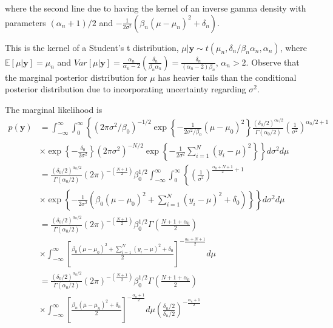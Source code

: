 \begin{enumerate}
where the second line due to having the kernel of an inverse gamma density with parameters $(\alpha_n+1)/2$ and $-\frac{1}{2\sigma^2}(\beta_n(\mu-\mu_n)^2+\delta_n)$.

This is the kernel of a Student's t distribution, $\mu|\mathbf{y}\sim t(\mu_n,\delta_n/\beta_n\alpha_n,\alpha_n)$, where $\mathbb{E}[\mu|\mathbf{y}]=\mu_n$ and $Var[\mu|\mathbf{y}]=\frac{\alpha_n}{\alpha_n-2}\left(\frac{\delta_n}{\beta_n\alpha_n}\right)=\frac{\delta_n}{(\alpha_n-2)\beta_n}$, $\alpha_n>2$. Observe that the marginal posterior distribution for $\mu$ has heavier tails than the conditional posterior distribution due to incorporating uncertainty regarding $\sigma^2$.

The marginal likelihood is
{\footnotesize{
\begin{align}
	p(\mathbf{y})&=\int_{-\infty}^{\infty}\int_{0}^{\infty}\left\{ (2\pi\sigma^2/\beta_0)^{-1/2}\exp\left\{-\frac{1}{2\sigma^2/\beta_0}(\mu-\mu_0)^2\right\}\frac{(\delta_0/2)^{\alpha_0/2}}{\Gamma(\alpha_0/2)}\left(\frac{1}{\sigma^2}\right)^{\alpha_0/2+1}\right.\nonumber\\
	&\times\left.\exp\left\{-\frac{\delta_0}{2\sigma^2}\right\}(2\pi\sigma^2)^{-N/2}\exp\left\{-\frac{1}{2\sigma^2}\sum_{i=1}^N(y_i-\mu)^2\right\}\right\}d\sigma^2d\mu\nonumber\\
	&=\frac{(\delta_0/2)^{\alpha_0/2}}{\Gamma(\alpha_0/2)}(2\pi)^{-\left(\frac{N+1}{2}\right)}\beta_0^{1/2}\int_{-\infty}^{\infty}\int_{0}^{\infty}\left\{\left(\frac{1}{\sigma^2}\right)^{\frac{\alpha_0+N+1}{2}+1}\right.\nonumber\\
	&\times\left.\exp\left\{-\frac{1}{2\sigma^2}(\beta_0(\mu-\mu_0)^2+\sum_{i=1}^N (y_i-\mu)^2+\delta_0)\right\}\right\}d\sigma^2d\mu\nonumber\\
	&=\frac{(\delta_0/2)^{\alpha_0/2}}{\Gamma(\alpha_0/2)}(2\pi)^{-\left(\frac{N+1}{2}\right)}\beta_0^{1/2}\Gamma\left(\frac{N+1+\alpha_0}{2}\right)\nonumber\\
	&\times \int_{-\infty}^{\infty} \left[\frac{\beta_0(\mu-\mu_0)^2+\sum_{i=1}^N(y_i-\mu)^2+\delta_0}{2}\right]^{-\frac{\alpha_0+N+1}{2}}d\mu\nonumber\\
	&=\frac{(\delta_0/2)^{\alpha_0/2}}{\Gamma(\alpha_0/2)}(2\pi)^{-\left(\frac{N+1}{2}\right)}\beta_0^{1/2}\Gamma\left(\frac{N+1+\alpha_0}{2}\right)\nonumber\\
	&\times \int_{-\infty}^{\infty} \left[\frac{\beta_n(\mu-\mu_n)^2+\delta_n}{2}\right]^{-\frac{\alpha_n+1}{2}}d\mu\left(\frac{\delta_n/2}{\delta_n/2}\right)^{-\frac{\alpha_n+1}{2}}\nonumber\\

\end{align}}}
\end{enumerate}
